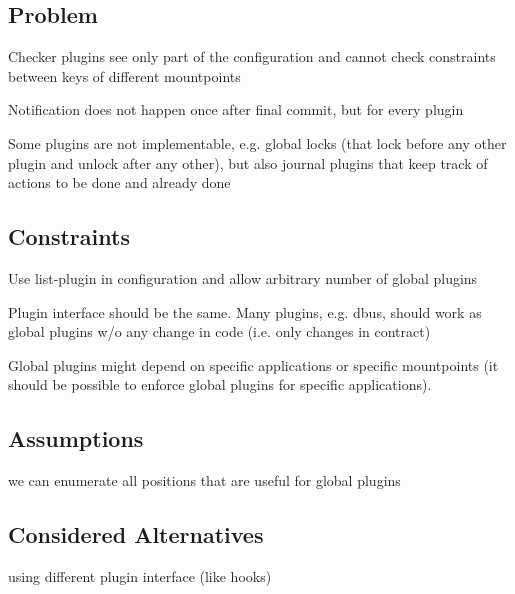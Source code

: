 \subsection*{Problem}


\begin{DoxyItemize}
\item Checker plugins see only part of the configuration and cannot check constraints between keys of different mountpoints
\item Notification does not happen once after final commit, but for every plugin
\item Some plugins are not implementable, e.\+g. global locks (that lock before any other plugin and unlock after any other), but also journal plugins that keep track of actions to be done and already done
\end{DoxyItemize}

\subsection*{Constraints}


\begin{DoxyItemize}
\item Use list-\/plugin in configuration and allow arbitrary number of global plugins
\item Plugin interface should be the same. Many plugins, e.\+g. dbus, should work as global plugins w/o any change in code (i.\+e. only changes in contract)
\item Global plugins might depend on specific applications or specific mountpoints (it should be possible to enforce global plugins for specific applications).
\end{DoxyItemize}

\subsection*{Assumptions}


\begin{DoxyItemize}
\item we can enumerate all positions that are useful for global plugins
\end{DoxyItemize}

\subsection*{Considered Alternatives}


\begin{DoxyItemize}
\item using different plugin interface (like hooks)
\end{DoxyItemize}

